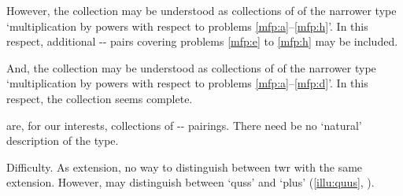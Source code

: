 \begin{note}
  However, the collection may be understood as collections of  of the narrower type `multiplication by powers with respect to problems \ref{mfp:a}--\ref{mfp:h}'.
  In this respect, additional -- pairs covering problems \ref{mfp:e} to \ref{mfp:h} may be included.

  And, the collection may be understood as collections of  of the narrower type `multiplication by powers with respect to problems \ref{mfp:a}--\ref{mfp:d}'.
  In this respect, the collection seems complete.

   are, for our interests, collections of -- pairings.
  There need be no `natural' description of the type.
\end{note}

\begin{note}
  Difficulty.
  As extension, no way to distinguish between twr  with the same extension.
  However, may distinguish between `quss' and `plus' (\autoref{illu:quus}, ).
\end{note}

\subsection{}
\label{sec:ptr0}

